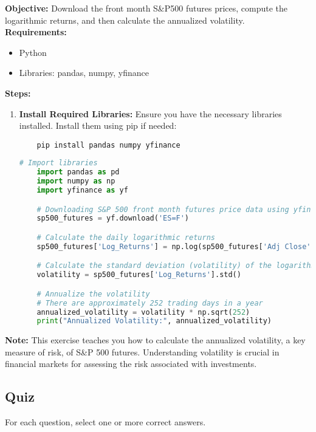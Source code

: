\documentclass{article}
\begin{document}
\textbf{Objective:} Download the front month S\&P500 futures prices, compute the logarithmic returns, and then calculate the annualized volatility. \\

\textbf{Requirements:}
\begin{itemize}
    \item Python
    \item Libraries: pandas, numpy, yfinance
\end{itemize}

\textbf{Steps:}

\begin{enumerate}
    \item \textbf{Install Required Libraries:} Ensure you have the necessary libraries installed. Install them using pip if needed:
    \begin{verbatim}
    pip install pandas numpy yfinance
    \end{verbatim}

    \begin{lstlisting}[language=Python]
    # Import libraries
    import pandas as pd
    import numpy as np
    import yfinance as yf

    # Downloading S&P 500 front month futures price data using yfinance
    sp500_futures = yf.download('ES=F')

    # Calculate the daily logarithmic returns
    sp500_futures['Log_Returns'] = np.log(sp500_futures['Adj Close'] / sp500_futures['Adj Close'].shift(1))

    # Calculate the standard deviation (volatility) of the logarithmic returns
    volatility = sp500_futures['Log_Returns'].std()

    # Annualize the volatility
    # There are approximately 252 trading days in a year
    annualized_volatility = volatility * np.sqrt(252)
    print("Annualized Volatility:", annualized_volatility)
    \end{lstlisting}
\end{enumerate}

\textbf{Note:} This exercise teaches you how to calculate the annualized volatility, a key measure of risk, of S\&P 500 futures. Understanding volatility is crucial in financial markets for assessing the risk associated with investments.

\subsection{Quiz}
For each question, select one or more correct answers.
\end{document}
